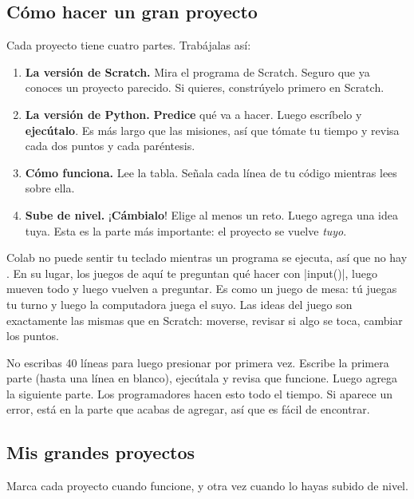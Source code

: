 \subsection*{Cómo hacer un gran proyecto}
Cada proyecto tiene cuatro partes. Trabájalas así:
\begin{enumerate}[label=\textbf{\arabic*.}]
  \item \textbf{La versión de Scratch.} Mira el programa de Scratch. Seguro que ya conoces un proyecto parecido. Si quieres, constrúyelo primero en Scratch.
  \item \textbf{La versión de Python.} \textbf{Predice} qué va a hacer. Luego escríbelo y \textbf{ejecútalo}. Es más largo que las misiones, así que tómate tu tiempo y revisa cada dos puntos y cada paréntesis.
  \item \textbf{Cómo funciona.} Lee la tabla. Señala cada línea de tu código mientras lees sobre ella.
  \item \textbf{Sube de nivel.} ¡\textbf{Cámbialo}! Elige al menos un reto. Luego agrega una idea tuya. Esta es la parte más importante: el proyecto se vuelve \emph{tuyo}.
\end{enumerate}

\begin{think}
Colab no puede sentir tu teclado mientras un programa se ejecuta, así que no hay . En su lugar, los juegos de aquí te preguntan qué hacer con \py|input()|, luego mueven todo y luego vuelven a preguntar. Es como un juego de mesa: tú juegas tu turno y luego la computadora juega el suyo. Las ideas del juego son exactamente las mismas que en Scratch: moverse, revisar si algo se toca, cambiar los puntos.
\end{think}

\begin{watchout}
No escribas 40 líneas para luego presionar \playbtn{} por primera vez. Escribe la primera parte (hasta una línea en blanco), ejecútala y revisa que funcione. Luego agrega la siguiente parte. Los programadores hacen esto todo el tiempo. Si aparece un error, está en la parte que acabas de agregar, así que es fácil de encontrar.
\end{watchout}

\subsection*{Mis grandes proyectos}
Marca cada proyecto cuando funcione, y otra vez cuando lo hayas subido de nivel.

